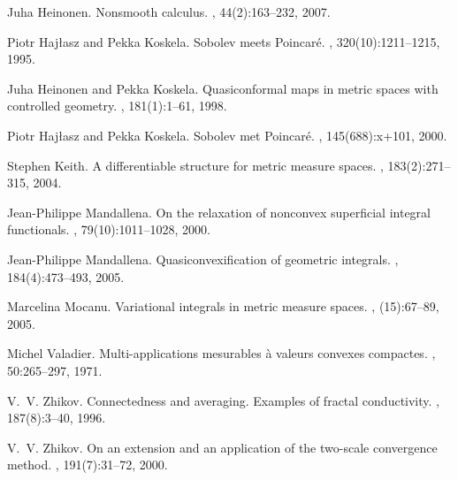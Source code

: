 \documentclass[10pt]{amsart}
\numberwithin{equation}{section}
\theoremstyle{definition}
\theoremstyle{remark}
\begin{document}
\begin{thebibliography}{AHM04}
Juha Heinonen.
\newblock Nonsmooth calculus.
, 44(2):163--232, 2007.

Piotr Haj{\l}asz and Pekka Koskela.
\newblock Sobolev meets {P}oincar\'e.
, 320(10):1211--1215,
  1995.

Juha Heinonen and Pekka Koskela.
\newblock Quasiconformal maps in metric spaces with controlled geometry.
, 181(1):1--61, 1998.

Piotr Haj{\l}asz and Pekka Koskela.
\newblock Sobolev met {P}oincar\'e.
, 145(688):x+101, 2000.

Stephen Keith.
\newblock A differentiable structure for metric measure spaces.
, 183(2):271--315, 2004.

Jean-Philippe Mandallena.
\newblock On the relaxation of nonconvex superficial integral functionals.
, 79(10):1011--1028, 2000.

Jean-Philippe Mandallena.
\newblock Quasiconvexification of geometric integrals.
, 184(4):473--493, 2005.

Marcelina Mocanu.
\newblock Variational integrals in metric measure spaces.
,
  (15):67--89, 2005.

Michel Valadier.
\newblock Multi-applications mesurables \`a valeurs convexes compactes.
, 50:265--297, 1971.

V.~V. Zhikov.
\newblock Connectedness and averaging. {E}xamples of fractal conductivity.
, 187(8):3--40, 1996.

V.~V. Zhikov.
\newblock On an extension and an application of the two-scale convergence
  method.
, 191(7):31--72, 2000.

\end{thebibliography}
\end{document}
